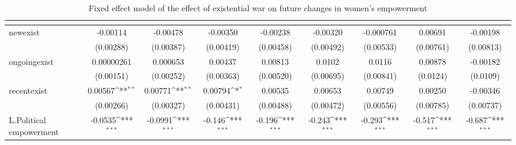 \begin{table}[htbp]\centering
\def\sym#1{\ifmmode^{#1}\else\(^{#1}\)\fi}
\caption{Fixed effect model of the effect of existential war on future changes in women's empowerment\label{existentialwarpolempower}}
\begin{tabular}{l*{8}{c}}
\hline\hline
                    &&&&&&&&\\
\hline
newexist            &    -0.00114         &    -0.00478         &    -0.00350         &    -0.00238         &    -0.00320         &   -0.000761         &     0.00691         &    -0.00198         \\
                    &   (0.00288)         &   (0.00387)         &   (0.00419)         &   (0.00458)         &   (0.00492)         &   (0.00533)         &   (0.00761)         &   (0.00813)         \\
[1em]
ongoingexist        &  0.00000261         &    0.000653         &     0.00437         &     0.00813         &      0.0102         &      0.0116         &     0.00878         &    -0.00182         \\
                    &   (0.00151)         &   (0.00252)         &   (0.00363)         &   (0.00520)         &   (0.00695)         &   (0.00841)         &    (0.0124)         &    (0.0109)         \\
[1em]
recentexist         &     0.00567\sym{**} &     0.00771\sym{**} &     0.00794\sym{*}  &     0.00535         &     0.00653         &     0.00749         &     0.00250         &    -0.00346         \\
                    &   (0.00266)         &   (0.00327)         &   (0.00431)         &   (0.00488)         &   (0.00472)         &   (0.00556)         &   (0.00785)         &   (0.00737)         \\
[1em]
L.Political empowerment&     -0.0535\sym{***}&     -0.0991\sym{***}&      -0.146\sym{***}&      -0.196\sym{***}&      -0.243\sym{***}&      -0.293\sym{***}&      -0.517\sym{***}&      -0.687\sym{***}\\

\end{tabular}
\end{table}
